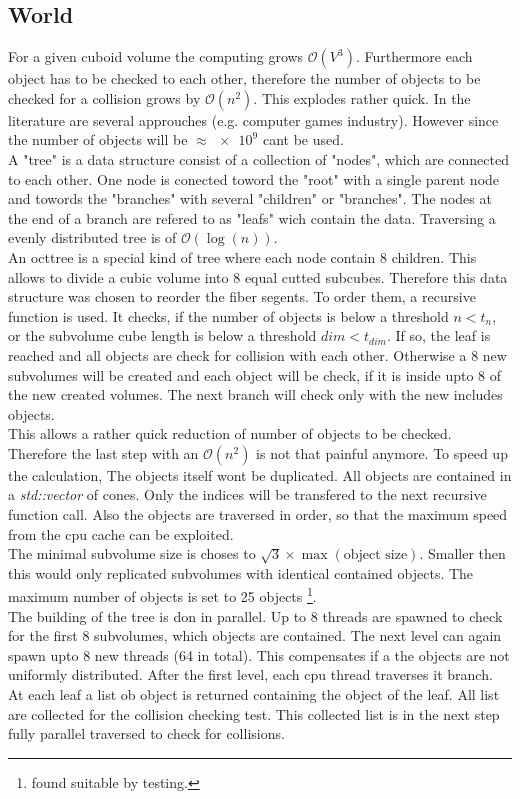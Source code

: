 \subsection{World}
For a given cuboid volume the computing grows $\mathcal{O}(V^3)$. Furthermore each object has to be checked to each other, therefore the number of objects to be checked for a collision grows by $\mathcal{O}(n^2)$. This explodes rather quick. In the literature are several approuches (e.g. computer games industry). However since the number of objects will be $\approx \num{e9}$ \dummy cant be used. \\
% 
A "tree" is a data structure consist of a collection of "nodes", which are connected to each other. One node is conected toword the "root" with a single parent node and towords the "branches" with several "children" or "branches". The nodes at the end of a branch are refered to as "leafs" wich contain the data. Traversing a  evenly distributed tree is of $\mathcal{O}(\log(n))$.\\
% 
An octtree is a special kind of tree where each node contain 8 children. This allows to divide a cubic volume into 8 equal cutted subcubes. Therefore this data structure was chosen to reorder the fiber segents. To order them, a recursive function is used. It checks, if the number of objects is below a threshold $n < t_n$, or the subvolume cube length is below a threshold $dim < t_{dim}$. If so, the leaf is reached and all objects are check for collision with each other. Otherwise a 8 new subvolumes will be created and each object will be check, if it is inside upto 8 of the new created volumes. The next branch will check only with the new includes objects. \\
% 
This allows a rather quick reduction of number of objects to be checked. Therefore the last step with an $\mathcal{O}(n^2)$ is not that painful anymore. To speed up the calculation, The objects itself wont be duplicated. All objects are contained in a \textit{std::vector} of cones. Only the indices will be transfered to the next recursive function call. Also the objects are traversed in order, so that the maximum speed from the cpu cache can be exploited. \\
% 
The minimal subvolume size is choses to $\sqrt{3} \times \max(\text{object size})$. Smaller then this would only replicated subvolumes with identical contained objects.
The maximum number of objects is set to \num{25} objects \footnote{found suitable by testing.}. \\
% 
The building of the tree is don in parallel. Up to 8 threads are spawned to check for the first 8 subvolumes, which objects are contained. The next level can again spawn upto 8 new threads (64 in total). This compensates if a the objects are not uniformly distributed. After the first level, each cpu thread traverses it branch. At each leaf a list ob object is returned containing the object of the leaf. All list are collected for the collision checking test. This collected list is in the next step fully parallel traversed to check for collisions.
% 
